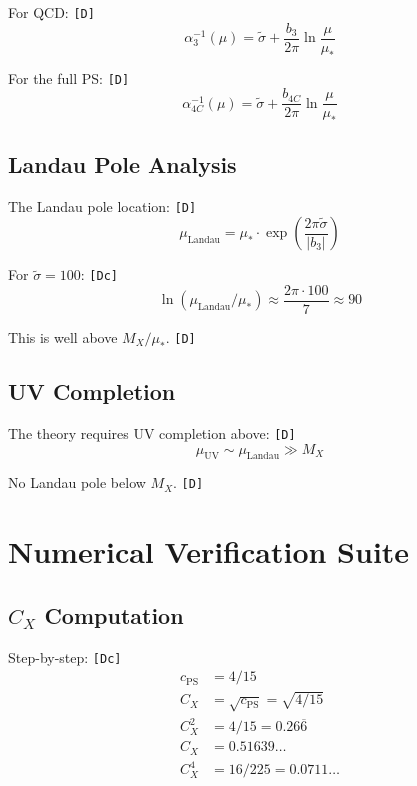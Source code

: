\documentclass[11pt,a4paper]{article}
\newcommand{\tagD}{\textcolor{green!50!black}{\texttt{[D]}}}
\newcommand{\tagDc}{\textcolor{blue!70!black}{\texttt{[Dc]}}}
\theoremstyle{definition}
\begin{document}
For QCD: \tagD{}
\begin{equation}
\label{eq:rg-qcd-flow}
\alpha_3^{-1}(\mu) = \tilde{\sigma} + \frac{b_3}{2\pi}\ln\frac{\mu}{\mu_*}
\end{equation}

For the full PS: \tagD{}
\begin{equation}
\label{eq:rg-ps-flow}
\alpha_{4C}^{-1}(\mu) = \tilde{\sigma} + \frac{b_{4C}}{2\pi}\ln\frac{\mu}{\mu_*}
\end{equation}

\subsection{Landau Pole Analysis}
\label{app:landau}

The Landau pole location: \tagD{}
\begin{equation}
\label{eq:landau-1}
\mu_{\text{Landau}} = \mu_* \cdot \exp\left(\frac{2\pi\tilde{\sigma}}{|b_3|}\right)
\end{equation}

For $\tilde{\sigma} = 100$: \tagDc{}
\begin{equation}
\label{eq:landau-2}
\ln(\mu_{\text{Landau}}/\mu_*) \approx \frac{2\pi \cdot 100}{7} \approx 90
\end{equation}

This is well above $M_X/\mu_*$. \tagD{}

\subsection{UV Completion}
\label{app:uv}

The theory requires UV completion above: \tagD{}
\begin{equation}
\label{eq:uv-scale}
\mu_{\text{UV}} \sim \mu_{\text{Landau}} \gg M_X
\end{equation}

No Landau pole below $M_X$. \tagD{}

\section{Numerical Verification Suite}
\label{app:num-verify}

\subsection{$C_X$ Computation}
\label{app:cx-comp}

Step-by-step: \tagDc{}
\begin{align}
\label{eq:cx-step-1}
c_{\text{PS}} &= 4/15 \\
\label{eq:cx-step-2}
C_X &= \sqrt{c_{\text{PS}}} = \sqrt{4/15} \\
\label{eq:cx-step-3}
C_X^2 &= 4/15 = 0.26\overline{6} \\
\label{eq:cx-step-4}
C_X &= 0.51639\ldots \\
\label{eq:cx-step-5}
C_X^4 &= 16/225 = 0.0711\ldots
\end{align}
\end{document}
